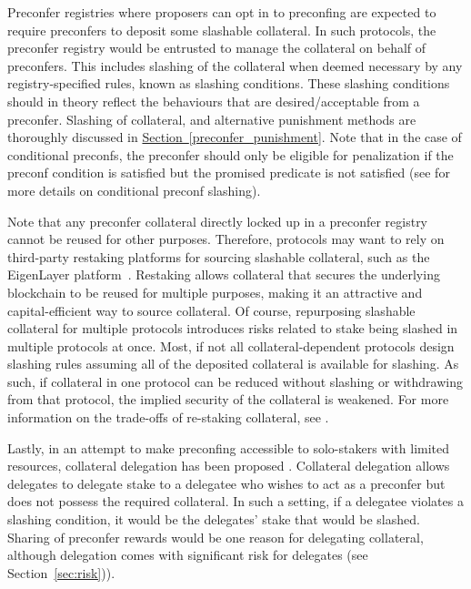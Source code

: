 \documentclass[a4paper]{article}
\theoremstyle{boldstyle}
\begin{document}
        Preconfer registries where proposers can opt in to preconfing are expected to require preconfers to deposit some slashable collateral. In such protocols, the preconfer registry would be entrusted to manage the collateral on behalf of preconfers. This includes slashing of the collateral when deemed necessary by any registry-specified rules, known as slashing conditions\cite{W:Documentation-RegisteringasaProvider,W:PreconfirmationRegistry}. 
        These slashing conditions should in theory reflect the behaviours that are desired/acceptable from a preconfer. Slashing of collateral, and alternative punishment methods are thoroughly discussed in \hyperref[preconfer_punishment]{Section~\ref{preconfer_punishment}}. Note that in the case of conditional preconfs, the preconfer should only be eligible for penalization if the preconf condition is satisfied but the promised predicate is not satisfied (see \cite{W:Documentation-Understandingmev-commit} for more details on conditional preconf slashing). 
         
        Note that any preconfer collateral directly locked up in a preconfer registry cannot be reused for other purposes. Therefore, protocols may want to rely on third-party restaking platforms for sourcing slashable collateral, such as the EigenLayer platform~\cite{W:RestakingOverview}. Restaking allows collateral that secures the underlying blockchain to be reused for multiple purposes, making it an attractive and capital-efficient way to source collateral. Of course, repurposing slashable collateral for multiple protocols introduces risks related to stake being slashed in multiple protocols at once. Most, if not all collateral-dependent protocols design slashing rules assuming all of the deposited collateral is available for slashing. As such, if collateral in one protocol can be reduced without slashing or withdrawing from that protocol, the implied security of the collateral is weakened. For more information on the trade-offs of re-staking collateral, see \cite{W:Restaking101:APrimeronEigenLayer}.
        
        \par 
        
        Lastly, in an attempt to make preconfing accessible to solo-stakers with limited resources, collateral delegation has been proposed \cite{W:CrediblyNeutralPreconfirmationCollateral:ThePreconfirmationRegistry}. Collateral delegation allows delegates to delegate stake to a delegatee who wishes to act as a preconfer but does not possess the required collateral. In such a setting, if a delegatee violates a slashing condition, it would be the delegates' stake that would be slashed. Sharing of preconfer rewards would be one reason for delegating collateral, although delegation comes with significant risk for delegates (see Section~\ref{sec:risk})).
\end{document}

